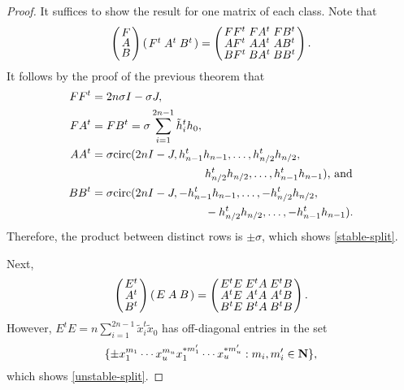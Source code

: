 \documentclass[../../../main]{subfiles}
\begin{document}
 \begin{proof}
  It suffices to show the result for one matrix of each class. Note that
  \[
  \arraycolsep=1.25pt\def\arraystretch{0.625}
   \left(\begin{array}{c}
    F \\ A \\ B
   \end{array}\right)
   \arraycolsep=1.25pt\def\arraystretch{0.625}
   \left(\begin{array}{ccc}
    F^t & A^t & B^t
   \end{array}\right)
   =
   \arraycolsep=1.25pt\def\arraystretch{0.625}
   \left(\begin{array}{ccc}
    FF^t & FA^t & FB^t \\
    AF^t & AA^t & AB^t \\
    BF^t & BA^t & BB^t
   \end{array}\right).
  \]
  It follows by the proof of the previous theorem that 
  \begin{align*}
  FF^t &= 2n\sigma I - \sigma J, \\ 
  FA^t &= FB^t = \sigma\sum_{i=1}^{2n-1}\tilde h_i^th_0, \\
  AA^t &= \sigma\text{circ}(2nI-J,h_{n-1}^th_{n-1}, \dots, h_{n/2}^th_{n/2}, \\ 
   &\qquad\qquad\qquad\qquad\qquad h_{n/2}^th_{n/2},\dots,h_{n-1}^th_{n-1}) \text{, and} \\
  BB^t &= \sigma\text{circ}(2nI-J,-h_{n-1}^th_{n-1}, \dots, -h_{n/2}^th_{n/2},\\ 
   &\qquad\qquad\qquad\qquad\qquad -h_{n/2}^th_{n/2},\dots,-h_{n-1}^th_{n-1}). 
  \end{align*}
  Therefore, the product between distinct rows is $\pm \sigma$, which shows \ref{stable-split}.
  
  Next,
  \[
  \arraycolsep=1.25pt\def\arraystretch{0.625}
   \left(\begin{array}{c}
    E^t \\ A^t \\ B^t
   \end{array}\right)
   \arraycolsep=1.25pt\def\arraystretch{0.625}
   \left(\begin{array}{ccc}
    E&A&B
   \end{array}\right)
   =
   \arraycolsep=1.25pt\def\arraystretch{0.625}
   \left(\begin{array}{ccc}
    E^tE & E^tA & E^tB \\
    A^tE & A^tA & A^tB \\
    B^tE & B^tA & B^tB
   \end{array}\right).
  \]
  However, $E^tE=n\sum_{i=1}^{2n-1}\tilde x_i^t \tilde x_0$ has off-diagonal entries in the set
  \[
    \{\pm x_1^{m_1} \cdots x_u^{m_u}x_1^{*m_1'} \cdots x_u^{*m_u'} : m_i,m_i' \in \mathbf{N}\},
  \]
  which shows \ref{unstable-split}.
 \end{proof}
 
\end{document}
